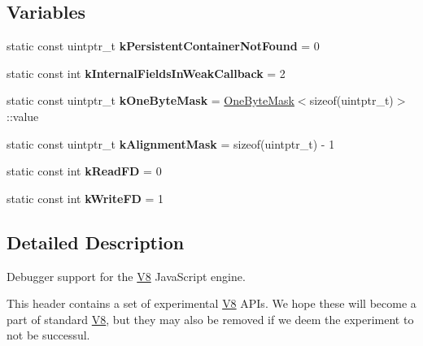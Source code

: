 \subsection*{Variables}
\begin{DoxyCompactItemize}
\item 
static const uintptr\+\_\+t {\bfseries k\+Persistent\+Container\+Not\+Found} = 0\hypertarget{namespacev8_add16ea53cb868b1828b3ef25264b897c}{}\label{namespacev8_add16ea53cb868b1828b3ef25264b897c}

\item 
static const int {\bfseries k\+Internal\+Fields\+In\+Weak\+Callback} = 2\hypertarget{namespacev8_a4dcca33d637c0aa7b2ca99fc6f934121}{}\label{namespacev8_a4dcca33d637c0aa7b2ca99fc6f934121}

\item 
static const uintptr\+\_\+t {\bfseries k\+One\+Byte\+Mask} = \hyperlink{structv8_1_1_one_byte_mask}{One\+Byte\+Mask}$<$sizeof(uintptr\+\_\+t)$>$\+::value\hypertarget{namespacev8_ad19d92a39500b5c1370b3391e924bc14}{}\label{namespacev8_ad19d92a39500b5c1370b3391e924bc14}

\item 
static const uintptr\+\_\+t {\bfseries k\+Alignment\+Mask} = sizeof(uintptr\+\_\+t) -\/ 1\hypertarget{namespacev8_a5c60df7b9429d7bb8863172967149023}{}\label{namespacev8_a5c60df7b9429d7bb8863172967149023}

\item 
static const int {\bfseries k\+Read\+FD} = 0\hypertarget{namespacev8_ac69324671a3529d2d19a49705635a498}{}\label{namespacev8_ac69324671a3529d2d19a49705635a498}

\item 
static const int {\bfseries k\+Write\+FD} = 1\hypertarget{namespacev8_aaa61be87f2ed717d8d3e07af41eb4ab7}{}\label{namespacev8_aaa61be87f2ed717d8d3e07af41eb4ab7}

\end{DoxyCompactItemize}


\subsection{Detailed Description}
Debugger support for the \hyperlink{classv8_1_1_v8}{V8} Java\+Script engine.

This header contains a set of experimental \hyperlink{classv8_1_1_v8}{V8} A\+P\+Is. We hope these will become a part of standard \hyperlink{classv8_1_1_v8}{V8}, but they may also be removed if we deem the experiment to not be successul.

